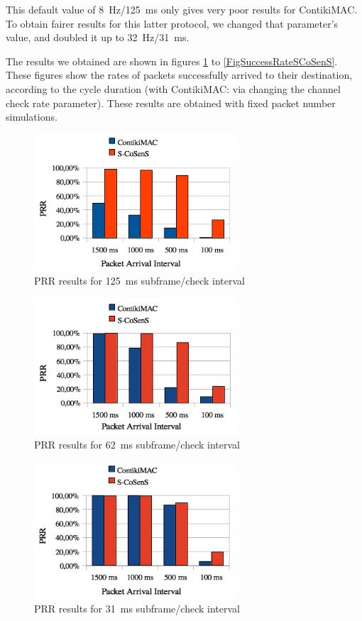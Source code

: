 \documentclass[conference]{IEEEtran}
\begin{document}
This default value of 8~Hz/125~ms only gives very poor results for ContikiMAC.
To obtain fairer results for this latter protocol, we changed that
parameter's value, and doubled it up to 32~Hz/31~ms.

The results we obtained are shown in figures \ref{FigSuccessRate8Hz} to
\ref{FigSuccessRateSCoSenS}. These figures show the rates of packets
successfully arrived to their destination, according to the cycle
duration (with ContikiMAC: via changing the channel check rate parameter).
These results are obtained with fixed packet number simulations.

\begin{figure}
  \centering
  \includegraphics[width=7.5cm]{graphes/PRR8Hz.png}
  \caption{PRR results for 125~ms subframe/check interval}
  \label{FigSuccessRate8Hz}
\end{figure}
\begin{figure}
  \centering
  \includegraphics[width=7.5cm]{graphes/PRR16Hz.png}
  \caption{PRR results for 62~ms subframe/check interval}
  \label{FigSuccessRate16Hz}
\end{figure}
\begin{figure}
  \centering
  \includegraphics[width=7.5cm]{graphes/PRR32Hz.png}
  \caption{PRR results for 31~ms subframe/check interval}
  \label{FigSuccessRate32Hz}
\end{figure}
\end{document}
